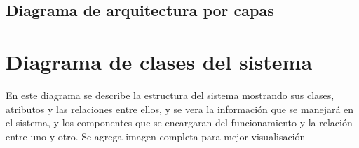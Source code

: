 \documentclass[12pt]{article}
\begin{document}
\subsection{Diagrama de arquitectura por capas}
\begin{center}
\end{center}
\pagebreak 



\section{Diagrama de clases del sistema}
En este diagrama se describe la estructura del sistema mostrando sus clases, atributos y las relaciones entre ellos, y se vera la informaci\'on que se manejar\'a en el sistema, y los componentes que se encargaran del funcionamiento y la relaci\'on entre uno y otro.
Se agrega imagen completa para mejor visualisaci\'on
\end{document}
